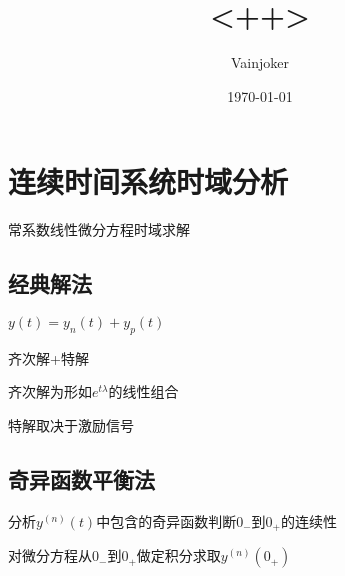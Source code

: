 \documentclass{article}
\title{<++>}
\author{Vainjoker}
\date{\today}
\begin{document}
    \maketitle
    \newpage

    \section{连续时间系统时域分析}%
    常系数线性微分方程时域求解
    \subsection{经典解法}%
    $y(t)=y_n(t)+y_p(t)$

    齐次解+特解

    齐次解为形如$e^{t\lambda} $的线性组合

    特解取决于激励信号%
    \subsection{奇异函数平衡法}%

    分析$y^(n)(t)$中包含的奇异函数判断$0_-$到$0_+$的连续性

    对微分方程从$0_-$到$0_+$做定积分求取$y^(n)(0_+)$


    
\end{document}
